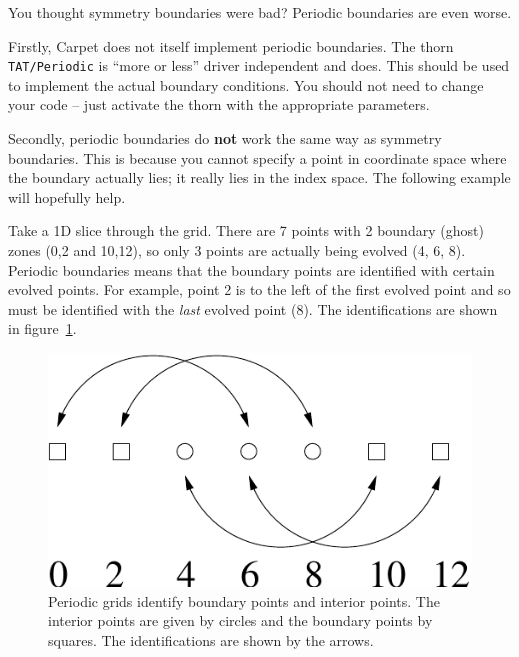 \begin{enumerate}
  You thought symmetry boundaries were bad? Periodic boundaries are
  even worse.

  Firstly, Carpet does not itself implement periodic boundaries. The
  thorn {\tt TAT/Periodic} is ``more or less'' driver independent and
  does. This should be used to implement the actual boundary
  conditions. You should not need to change your code -- just activate
  the thorn with the appropriate parameters.

  Secondly, periodic boundaries do {\bf not} work the same way as
  symmetry boundaries. This is because you cannot specify a point in
  coordinate space where the boundary actually lies; it really lies in
  the index space. The following example will hopefully help.
  
  Take a 1D slice through the grid. There are 7 points with 2 boundary
  (ghost) zones (0,2 and 10,12), so only 3 points are actually being
  evolved (4, 6, 8). Periodic boundaries means that the boundary points
  are identified with certain evolved points. For example, point 2 is
  to the left of the first evolved point and so must be identified
  with the \textit{last} evolved point (8). The identifications are
  shown in figure~\ref{fig:Periodic1}.
  \begin{figure}[htbp]
    \begin{center}
      \includegraphics[scale=0.5]{Periodic1}
      \caption{Periodic grids identify boundary points and interior
        points. The interior points are given by circles and the
        boundary points by squares. The identifications are shown by the
        arrows.}
      \label{fig:Periodic1}
    \end{center}
  \end{figure}


\end{enumerate}
